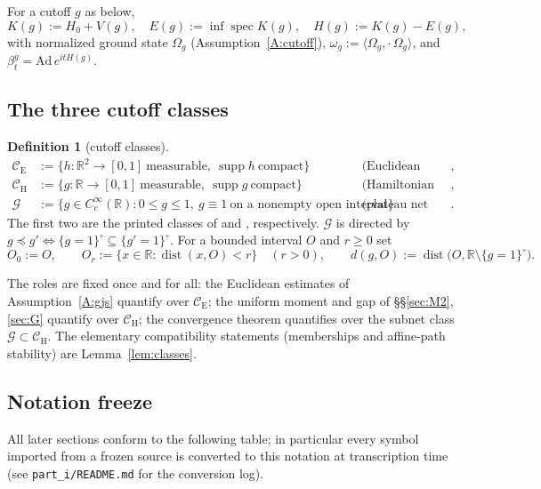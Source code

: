 \documentclass[11pt,a4paper]{article}
\theoremstyle{plain}
\theoremstyle{definition}
\newtheorem{definition}[theorem]{Definition}
\theoremstyle{plain}
\theoremstyle{definition}
\newcommand{\R}{\mathbb{R}}
\newcommand{\G}{\mathcal{G}}
\newcommand{\CE}{\mathcal{C}_{\mathrm E}}
\newcommand{\CH}{\mathcal{C}_{\mathrm H}}
\newcommand{\Om}{\Omega}
\newcommand{\ip}[2]{\langle #1,#2\rangle}
\DeclareMathOperator{\supp}{supp}
\DeclareMathOperator{\dist}{dist}
\DeclareMathOperator{\spec}{spec}
\begin{document}
For a cutoff $g$ as
below,
\[
  K(g):=H_0+V(g),\quad E(g):=\inf\spec K(g),\quad H(g):=K(g)-E(g),
\]
with normalized ground state $\Om_g$ (Assumption~\ref{A:cutoff}),
$\omega_g:=\ip{\Om_g}{\cdot\,\Om_g}$, and $\beta^g_t=\mathrm{Ad}\,e^{itH(g)}$.

\subsection{The three cutoff classes}\label{subsec:classes}

\begin{definition}[cutoff classes]\label{def:classes}
\begin{align*}
 \CE&:=\{h:\R^2\to[0,1]\ \text{measurable},\ \supp h\ \text{compact}\}
 &&\text{(Euclidean class)},\\
 \CH&:=\{g:\R\to[0,1]\ \text{measurable},\ \supp g\ \text{compact}\}
 &&\text{(Hamiltonian class)},\\
 \G&:=\{g\in C_c^\infty(\R):0\le g\le1,\ g\equiv1\ \text{on a nonempty open interval}\}
 &&\text{(plateau net class)}.
\end{align*}
The first two are the printed classes of \cite[p.~589]{GJS} and
\cite[(1.6), p.~588]{GJS}, respectively.
$\G$ is directed by $g\preccurlyeq g'\iff\{g=1\}^\circ\subseteq\{g'=1\}^\circ$. For a bounded
interval $O$ and $r\ge0$ set
\[
 O_0:=O,\qquad O_r:=\{x\in\R:\dist(x,O)<r\}\quad(r>0),\qquad
 d(g,O):=\dist\bigl(O,\R\setminus\{g=1\}^\circ\bigr).
\]
\end{definition}

The roles are fixed once and for all: the Euclidean estimates of Assumption~\ref{A:gjs}
quantify over $\CE$; the uniform moment and gap of \S\S\ref{sec:M2}, \ref{sec:G} quantify over
$\CH$; the convergence theorem quantifies over the subnet class $\G\subset\CH$. The elementary
compatibility statements (memberships and affine-path stability) are
Lemma~\ref{lem:classes}.

\subsection{Notation freeze}\label{subsec:freeze}

All later sections conform to the following table; in particular every symbol imported from a
frozen source is converted to this notation at transcription time (see
\texttt{part\_i/README.md} for the conversion log).
\end{document}
